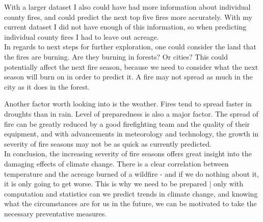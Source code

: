 \documentclass[fontsize=11pt]{article}
\begin{document}
With a larger dataset I also could have had more information about individual county fires, and could predict the next top five fires more accurately. With my current dataset I did not have enough of this information, so when predicting individual county fires I had to leave out acreage.\\

In regards to next steps for further exploration, one could consider the land that the fires are burning. Are they burning in forests? Or cities? This could potentially affect the next fire season, because we need to consider what the next season will burn on in order to predict it. A fire may not spread as much in the city as it does in the forest. 

Another factor worth looking into is the weather. Fires tend to spread faster in droughts than in rain. Level of preparedness is also a major factor. The spread of fire can be greatly reduced by a good firefighting team and the quality of their equipment, and with advancements in meteorology and technology, the growth in severity of fire seasons may not be as quick as currently predicted.\\

In conclusion, the increasing severity of fire seasons offers great insight into the damaging effects of climate change. There is a clear correlation between temperature and the acreage burned of a wildfire - and if we do nothing about it, it is only going to get worse. This is why we need to be prepared | only with computation and statistics can we predict trends in climate change, and knowing what the circumstances are for us in the future, we can be motivated to take the necessary preventative measures.
\end{document}
